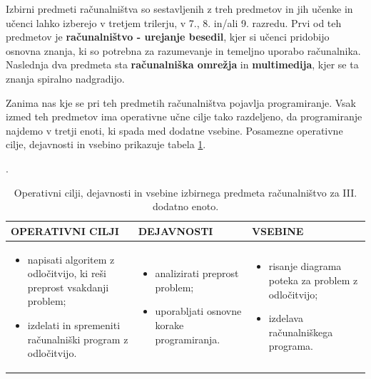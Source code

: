 Izbirni predmeti računalništva so sestavljenih z treh predmetov in jih
učenke in učenci lahko izberejo v tretjem trilerju, v 7., 8. in/ali
9. razredu. Prvi od teh predmetov je \textbf{računalništvo - urejanje
  besedil}, kjer si učenci pridobijo osnovna znanja, ki so potrebna za
razumevanje in temeljno uporabo računalnika. Naslednja dva predmeta
sta \textbf{računalniška omrežja} in \textbf{multimedija}, kjer se ta
znanja spiralno nadgradijo.


Zanima nas kje se pri teh predmetih računalništva pojavlja
programiranje. Vsak izmed teh predmetov ima operativne učne cilje tako
razdeljeno, da programiranje najdemo v tretji enoti, ki spada med
dodatne vsebine. Posamezne operativne cilje, dejavnosti in vsebino
prikazuje tabela \ref{tab:cilji_izb_prog}.

\begin{table}[!htb]
  \caption{Operativni cilji, dejavnosti in vsebine izbirnega predmeta
    računalništvo za III. dodatno enoto. \cite{ucni_nacrt-izbirni-os}}.
\label{tab:cilji_izb_prog}
\begin{tabular}{
  | p{} |
  p{} |
  p{} | }
  \hline
  \rowcolor{gray!50}
  \textbf{OPERATIVNI CILJI} & \textbf{DEJAVNOSTI} & \textbf{VSEBINE} \\
  \hline

  \begin{itemize}[leftmargin=*]
    \tightlist
  \item napisati algoritem z odločitvijo, ki reši preprost vsakdanji
    problem;
  \item izdelati in spremeniti računalniški program z odločitvijo.
  \end{itemize}
  &
  \begin{itemize}[leftmargin=*]
  \item analizirati preprost problem;
  \item uporabljati osnovne korake programiranja.
  \end{itemize}
 &
  \begin{itemize}[leftmargin=*]
  \item risanje diagrama poteka za problem z odločitvijo;
  \item izdelava računalniškega programa.
  \end{itemize}
 \\
 \hline

\end{tabular}
\end{table}

